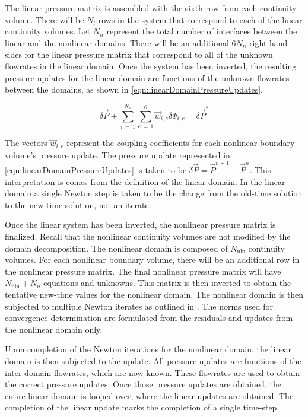 The linear pressure matrix is assembled with the sixth row from each continuity volume.
There will be $N_{l}$ rows in the system that correspond to each of the linear continuity volumes.
Let $N_{n}$ represent the total number of interfaces between the linear and the nonlinear domains.
There will be an additional $6 N_{n}$ right hand sides for the linear pressure matrix that correspond to all of the unknown flowrates in the linear domain.
Once the system has been inverted, the resulting pressure updates for the linear domain are functions of the unknown flowrates between the domains, as shown in \eqref{eqn:linearDomainPressureUpdates}.

\begin{equation}
\label{eqn:linearDomainPressureUpdates}
\delta \vec{P} + \sum_{i\,=\,1}^{N_{n}} \sum_{e\,=\,1}^{6} \vec{w}_{i, e} \delta \Psi_{i, e} = \delta \vec{P}^{*} 
\end{equation}

The vectors $\vec{w}_{i, e}$ represent the coupling coefficients for each nonlinear boundary volume's pressure update.
The pressure update represented in \eqref{eqn:linearDomainPressureUpdates} is taken to be $\delta \vec{P} = \vec{P}^{n+1} - \vec{P}^{n}$.
This interpretation is comes from the definition of the linear domain.
In the linear domain a single Newton step is taken to be the change from the old-time solution to the new-time solution, not an iterate.

Once the linear system has been inverted, the nonlinear pressure matrix is finalized.
Recall that the nonlinear continuity volumes are not modified by the domain decomposition.
The nonlinear domain is composed of $N_{\text{nln}}$ continuity volumes.
For each nonlinear boundary volume, there will be an additional row in the nonlinear pressure matrix.
The final nonlinear pressure matrix will have $N_{\text{nln}} + N_{n}$ equations and unknowns.
This matrix is then inverted to obtain the tentative new-time values for the nonlinear domain.
The nonlinear domain is then subjected to multiple Newton iterates as outlined in .
The norms used for convergence determination are formulated from the residuals and updates from the nonlinear domain only.

Upon completion of the Newton iterations for the nonlinear domain, the linear domain is then subjected to the update.
All pressure updates are functions of the inter-domain flowrates, which are now known.
These flowrates are used to obtain the correct pressure updates.
Once those pressure updates are obtained, the entire linear domain is looped over, where the linear updates are obtained.
The completion of the linear update marks the completion of a single time-step.

